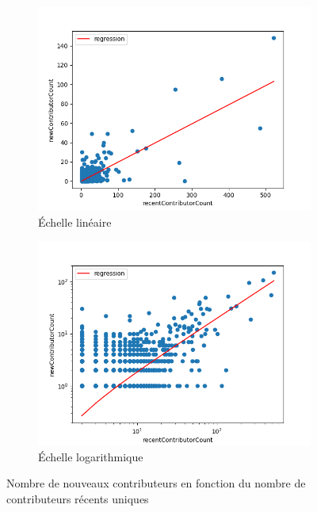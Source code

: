 \begin{figure}[ht]
    \centering
    \begin{subfigure}[t]{0.5\textwidth}
        \includegraphics[width=\textwidth]{experiment/data_analysis/recentContributorCountRegression_linearScale.png}
        \caption{Échelle linéaire}
    \end{subfigure}%
    \begin{subfigure}[t]{0.5\textwidth}
        \includegraphics[width=\textwidth]{experiment/data_analysis/recentContributorCountRegression_logScale.png}
        \caption{Échelle logarithmique}
    \end{subfigure}

    
    \caption{Nombre de nouveaux contributeurs en fonction du nombre de contributeurs récents uniques}
    \label{fig:contributorCount}
\end{figure}

